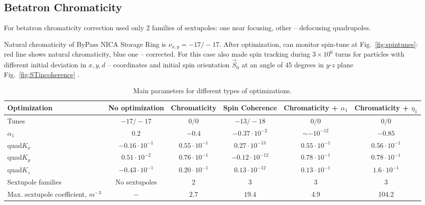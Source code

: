 \documentclass[a4paper,
               keeplastbox,   %
               ]{jacow}
\begin{document}
\subsection{Betatron Chromaticity}

\par For betatron chromaticity correction used only 2 families of sextupoles:
one near focusing, other – defocusing quadrupoles. 

Natural chromaticity of ByPass NICA Storage Ring is $\nu_{x,y} = -17/-17$. After optimization, can monitor spin-tune at Fig.~\ref{fig:spintunes}: red line shows natural chromaticity, blue one – corrected. For this case also made spin tracking during $3\times10^{6}$ turns for particles with different initial deviation in $x,y,d$ – coordinates and initial spin orientation $\vec{S}_{0}$ at an angle of 45 degrees in $y$-$z$ plane Fig.~\ref{fig:STincoherence} \cite{COSYINF}.

\begin{table}[!t]
    \setlength{\tabcolsep}{4pt}
    \renewcommand{\arraystretch}{1.2}
    \centering
     \caption{Main parameters for different types of optimizations.}
    \begin{tabular}{lccccc}
    \hline
        \textbf{Optimization} & \textbf{No optimization} & \textbf{Chromaticity} & \textbf{Spin Coherence} & \textbf{Chromaticity + $\alpha_1$} & \textbf{Chromaticity + $\eta_{1}$} \\ 
        \hline
        Tunes & $-17/-17$ & $0/0$ & $-13/-18$ & $0/0$ & $0/0$ \\ 
        $\alpha_{1}$ & $0.2$ & $-0.4$ & $-0.37\cdot10^{-2}$ & $\sim -10^{-12}$ & $-0.85$ \\ 
        quad$K_x$ & $-0.16\cdot10^{-1}$ & $0.55\cdot10^{-1}$ &  $0.27\cdot10^{-13}$ & $0.55\cdot10^{-1}$ & $0.56\cdot10^{-1}$ \\ 
        quad$K_y$ & $0.51\cdot10^{-2}$ & $0.76\cdot10^{-1}$ & $-0.12\cdot10^{-12}$ & $0.78\cdot10^{-1}$ & $0.78\cdot10^{-1}$ \\ 
        quad$K_z$ & $-0.43\cdot10^{-1}$ & $0.20\cdot10^{-1}$ & $0.13\cdot10^{-12}$ & $0.13\cdot10^{-1}$ & $1.6\cdot10^{-1}$ \\ 
        Sextupole families & No sextupoles & 2 & 3 & 3 & 3 \\ 
        \makecell*[l]{Max. sextupole \\ coefficient, $m^{-3}$} & $-$ & $2.7$ & $19.4$ & 4.9 & 104.2 \\ \hline
    \end{tabular}
    \label{Params}
\end{table}
\end{document}
